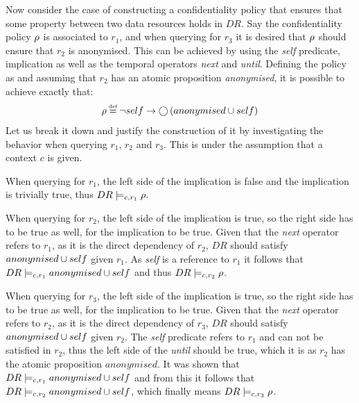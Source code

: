 \begin{example}
Now consider the case of constructing a confidentiality policy that ensures that some property between two data resources holds in $DR$. Say the confidentiality policy $\rho$ is associated to $r_1$, and when querying for $r_3$ it is desired that $\rho$ should ensure that $r_2$ is anonymised. This can be achieved by using the \emph{self} predicate, implication as well as the temporal operators \emph{next} and \emph{until}. Defining the policy as and assuming that $r_2$ has an atomic proposition \emph{anonymised}, it is possible to achieve exactly that:
\begin{align*}
    \conf \eqdef \lnot self \imply \X \left( anonymised \U self \right)
\end{align*}
Let us break it down and justify the construction of it by investigating the behavior when querying $r_1$, $r_2$ and $r_3$. This is under the assumption that a context $c$ is given.

When querying for $r_1$, the left side of the implication is false and the implication is trivially true, thus $DR \models_{c,r_1} \rho$. 

When querying for $r_2$, the left side of the implication is true, so the right side has to be true as well, for the implication to be true. Given that the \emph{next} operator refers to $r_1$, as it is the direct dependency of $r_2$, $DR$ should satisfy $anonymised \cup self$ given $r_1$. As \emph{self} is a reference to $r_1$ it follows that $DR \models_{c,r_1} anonymised \cup self$ and thus $DR \models_{c,r_2} \rho$.

When querying for $r_3$, the left side of the implication is true, so the right side has to be true as well, for the implication to be true. Given that the \emph{next} operator refers to $r_2$, as it is the direct dependency of $r_3$, $DR$ should satisfy $anonymised \cup self$ given $r_2$. The \emph{self} predicate refers to $r_1$ and can not be satisfied in $r_2$, thus the left side of the \emph{until} should be true, which it is as $r_2$ has the atomic proposition $anonymised$. It was shown that $DR \models_{c,r_1} anonymised \cup self$ and from this it follows that $DR \models_{c,r_2} anonymised \cup self$, which finally means $DR \models_{c,r_3} \rho$.
\end{example}

